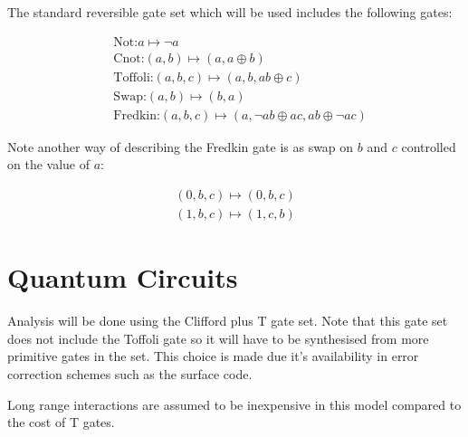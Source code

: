The standard reversible gate set which will be used includes the following gates:

\begin{align*}
	&\text{Not:} a \mapsto \neg a \\
	&\text{Cnot:} (a,b) \mapsto (a,a\oplus b) \\
    &\text{Toffoli:} (a,b,c) \mapsto (a,b,ab\oplus c) \\
	&\text{Swap:} (a,b) \mapsto (b,a) \\
	&\text{Fredkin:} (a,b,c) \mapsto (a,\neg a b \oplus ac, ab\oplus \neg a c)
\end{align*}

Note another way of describing the Fredkin gate is as swap on $b$ and $c$
controlled on the value of $a$:

\begin{align*}
    (0,b,c) \mapsto (0,b,c)\\
    (1,b,c) \mapsto (1,c,b)
\end{align*}


\section{Quantum Circuits}

Analysis will be done using the Clifford plus T gate set.  Note that this gate
set does not include the Toffoli gate so it will have to be synthesised from
more primitive gates in the set.  This choice is made due it's availability in
error correction schemes such as the surface code\cites{}.

Long range interactions are assumed to be inexpensive in this model compared to
the cost of T gates.

